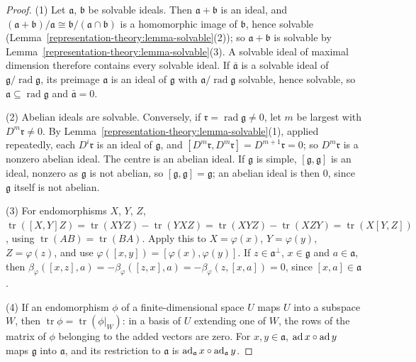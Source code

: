 \begin{proof}
(1) Let $\mathfrak{a}$, $\mathfrak{b}$ be solvable ideals. Then $\mathfrak{a} + \mathfrak{b}$ is an ideal, and $(\mathfrak{a} + \mathfrak{b})/\mathfrak{a} \cong
\mathfrak{b}/(\mathfrak{a} \cap \mathfrak{b})$ is a homomorphic image of $\mathfrak{b}$, hence solvable (Lemma~\ref{representation-theory:lemma-solvable}(2)); so
$\mathfrak{a} + \mathfrak{b}$ is solvable by Lemma~\ref{representation-theory:lemma-solvable}(3). A solvable ideal of maximal dimension therefore contains every solvable
ideal. If $\bar{\mathfrak{a}}$ is a solvable ideal of $\mathfrak{g}/\operatorname{rad}\mathfrak{g}$, its preimage $\mathfrak{a}$ is an ideal of $\mathfrak{g}$ with
$\mathfrak{a}/\operatorname{rad}\mathfrak{g}$ solvable, hence solvable, so $\mathfrak{a} \subseteq \operatorname{rad}\mathfrak{g}$ and $\bar{\mathfrak{a}} = 0$.

(2) Abelian ideals are solvable. Conversely, if $\mathfrak{r} = \operatorname{rad}\mathfrak{g} \neq 0$, let $m$ be largest with $D^m\mathfrak{r} \neq 0$. By
Lemma~\ref{representation-theory:lemma-solvable}(1), applied repeatedly, each $D^i\mathfrak{r}$ is an ideal of $\mathfrak{g}$, and
$[D^m\mathfrak{r}, D^m\mathfrak{r}] = D^{m+1}\mathfrak{r} = 0$; so $D^m\mathfrak{r}$ is a nonzero abelian ideal. The centre is an abelian ideal. If $\mathfrak{g}$ is simple,
$[\mathfrak{g}, \mathfrak{g}]$ is an ideal, nonzero as $\mathfrak{g}$ is not abelian, so $[\mathfrak{g}, \mathfrak{g}] = \mathfrak{g}$; an abelian ideal is then $0$, since
$\mathfrak{g}$ itself is not abelian.

(3) For endomorphisms $X$, $Y$, $Z$, $\operatorname{tr}([X, Y]Z) = \operatorname{tr}(XYZ) - \operatorname{tr}(YXZ) = \operatorname{tr}(XYZ) - \operatorname{tr}(XZY)
= \operatorname{tr}(X[Y, Z])$, using $\operatorname{tr}(AB) = \operatorname{tr}(BA)$. Apply this to $X = \varphi(x)$, $Y = \varphi(y)$, $Z = \varphi(z)$, and use
$\varphi([x, y]) = [\varphi(x), \varphi(y)]$. If $z \in \mathfrak{a}^\perp$, $x \in \mathfrak{g}$ and $a \in \mathfrak{a}$, then
$\beta_\varphi([x, z], a) = -\beta_\varphi([z, x], a) = -\beta_\varphi(z, [x, a]) = 0$, since $[x, a] \in \mathfrak{a}$.

(4) If an endomorphism $\phi$ of a finite-dimensional space $U$ maps $U$ into a subspace $W$, then $\operatorname{tr}\phi = \operatorname{tr}(\phi|_W)$: in a basis of $U$
extending one of $W$, the rows of the matrix of $\phi$ belonging to the added vectors are zero. For $x, y \in \mathfrak{a}$, $\operatorname{ad} x \circ \operatorname{ad} y$ maps $\mathfrak{g}$ into
$\mathfrak{a}$, and its restriction to $\mathfrak{a}$ is $\operatorname{ad}_{\mathfrak{a}}x \circ \operatorname{ad}_{\mathfrak{a}}y$.
\end{proof}

